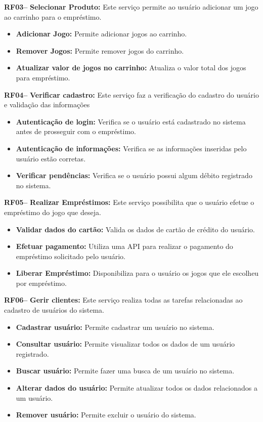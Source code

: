 \documentclass[a4paper, 12pt]{article}
\begin{document}
\textbf{RF03--} \textbf{Selecionar Produto:} Este serviço permite ao usuário adicionar um jogo ao carrinho para o empréstimo.

\begin{itemize}
    \item \textbf{Adicionar Jogo:} Permite adicionar jogos ao carrinho.
    \item \textbf{Remover Jogos:} Permite remover jogos do carrinho.
    \item \textbf{Atualizar valor de jogos no carrinho:} Atualiza o valor total dos jogos para empréstimo.
\end{itemize}

\textbf{RF04--} \textbf{Verificar cadastro:} Este serviço faz a verificação do cadastro do usuário e validação das informações
\begin{itemize}
    \item \textbf{Autenticação de login:} Verifica se o usuário está cadastrado no sistema antes de prosseguir com o empréstimo.
    \item \textbf{Autenticação de informações:} Verifica se as informações inseridas pelo usuário estão corretas.
    \item \textbf{Verificar pendências:} Verifica se o usuário possui algum débito registrado no sistema.
\end{itemize}

\textbf{RF05--} \textbf{Realizar Empréstimos:} Este serviço possibilita que o usuário efetue o empréstimo do jogo que deseja.
\begin{itemize}
    \item \textbf{Validar dados do cartão:} Valida os dados de cartão de crédito do usuário.
    \item \textbf{Efetuar pagamento:} Utiliza uma API para realizar o pagamento do empréstimo solicitado pelo usuário.
    \item \textbf{Liberar Empréstimo:} Disponibiliza para o usuário os jogos que ele escolheu por empréstimo.
\end{itemize}

\textbf{RF06--} \textbf{Gerir clientes:} Este serviço realiza todas as tarefas relacionadas ao cadastro de usuários do sistema.
\begin{itemize}
    \item \textbf{Cadastrar usuário:} Permite cadastrar um usuário no sistema.
    \item \textbf{Consultar usuário:} Permite visualizar todos os dados de um usuário registrado.
    \item \textbf{Buscar usuário:} Permite fazer uma busca de um usuário no sistema.
    \item \textbf{Alterar dados do usuário:} Permite atualizar todos os dados relacionados a um usuário.
    \item \textbf{Remover usuário:} Permite excluir o usuário do sistema.
\end{itemize}
\end{document}
